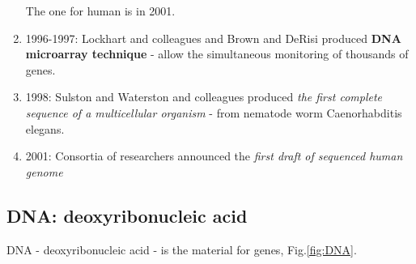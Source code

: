 \begin{enumerate}
  The one for human is in 2001.
  
  \item 1996-1997: Lockhart and colleagues and Brown and DeRisi produced {\bf
  DNA microarray technique} - allow the simultaneous monitoring of thousands of
  genes.
  
  \item 1998: Sulston and Waterston and colleagues produced {\it the first
  complete sequence of a multicellular organism} - from nematode worm
  Caenorhabditis elegans.
  
  \item 2001: Consortia of researchers announced the {\it first draft of
  sequenced human genome}
\end{enumerate}

\subsection{DNA: deoxyribonucleic acid}
\label{sec:dna}
\label{sec:amino-acid}


DNA  -  deoxyribonucleic acid  -  is the material for genes, Fig.\ref{fig:DNA}.

